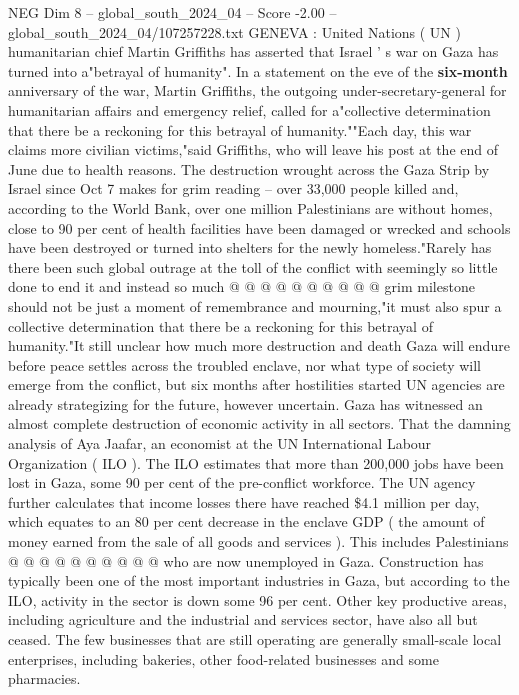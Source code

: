 \begin{textsample}{NEG Dim 8 – global\_south\_2024\_04 – Score -2.00 – global\_south\_2024\_04/107257228.txt}  \label{ex:f8_neg_034}
GENEVA : United Nations ( UN ) humanitarian chief Martin Griffiths has asserted that Israel ' s war on Gaza has turned into a"betrayal of humanity".
In a statement on the eve of the \textbf{six-month} anniversary of the war, Martin Griffiths, the outgoing under-secretary-general for humanitarian affairs and emergency relief, called for a"collective determination that there be a reckoning for this betrayal of humanity.""Each day, this war claims more civilian victims,"said Griffiths, who will leave his post at the end of June due to health reasons.
The destruction wrought across the Gaza Strip by Israel since Oct 7 makes for grim reading -- over 33,000 people killed and, according to the World Bank, over one million Palestinians are without homes, close to 90 per cent of health facilities have been damaged or wrecked and schools have been destroyed or turned into shelters for the newly homeless."Rarely has there been such global outrage at the toll of the conflict with seemingly so little done to end it and instead so much @ @ @ @ @ @ @ @ @ @ grim milestone should not be just a moment of remembrance and mourning,"it must also spur a collective determination that there be a reckoning for this betrayal of humanity."It still unclear how much more destruction and death Gaza will endure before peace settles across the troubled enclave, nor what type of society will emerge from the conflict, but six months after hostilities started UN agencies are already strategizing for the future, however uncertain.
Gaza has witnessed an almost complete destruction of economic activity in all sectors.
That the damning analysis of Aya Jaafar, an economist at the UN International Labour Organization ( ILO ).
The ILO estimates that more than 200,000 jobs have been lost in Gaza, some 90 per cent of the pre-conflict workforce.
The UN agency further calculates that income losses there have reached \$4.1 million per day, which equates to an 80 per cent decrease in the enclave GDP ( the amount of money earned from the sale of all goods and services ).
This includes Palestinians @ @ @ @ @ @ @ @ @ @ who are now unemployed in Gaza.
Construction has typically been one of the most important industries in Gaza, but according to the ILO, activity in the sector is down some 96 per cent.
Other key productive areas, including agriculture and the industrial and services sector, have also all but ceased.
The few businesses that are still operating are generally small-scale local enterprises, including bakeries, other food-related businesses and some pharmacies.

\end{textsample}
